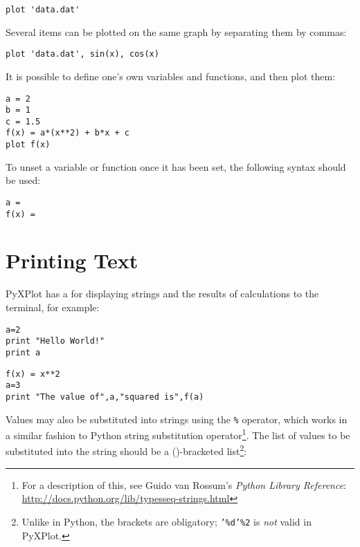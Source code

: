 \begin{verbatim}
plot 'data.dat'
\end{verbatim}

Several items can be plotted on the same graph by separating them by commas:

\begin{verbatim}
plot 'data.dat', sin(x), cos(x)
\end{verbatim}

\noindent It is possible to define one's own variables and functions, and then
plot them:

\begin{verbatim}
a = 2
b = 1
c = 1.5
f(x) = a*(x**2) + b*x + c
plot f(x)
\end{verbatim}

\noindent To unset a variable or function once it has been set, the following
syntax should be
used:

\begin{verbatim}
a =
f(x) =
\end{verbatim}

\section{Printing Text}
\label{string_subs_op}

PyXPlot has a  for displaying strings and the results of
calculations to the terminal, for example:

\begin{verbatim}
a=2
print "Hello World!"
print a
\end{verbatim}

\begin{verbatim}
f(x) = x**2
a=3
print "The value of",a,"squared is",f(a)
\end{verbatim}

\noindent Values may also be substituted into strings using the {\tt \%}
operator, which works in a similar fashion
to Python string substitution operator\footnote{For a description of this, see Guido van
Rossum's {\it Python Library Reference}: \url{http://docs.python.org/lib/typesseq-strings.html}}.
The list of values to be substituted into the string should be a ()-bracketed
list\footnote{Unlike in Python, the brackets are obligatory; {\tt '\%d'\%2} is
{\it not} valid in PyXPlot.}:

